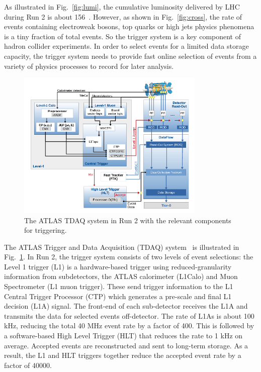 \par As illustrated in Fig.~\ref{fig:lumi}, the cumulative luminosity delivered by LHC during Run 2 is about 156~\ifb. However, as shown in Fig.~\ref{fig:cross}, the rate of events containing electroweak bosons, top quarks or high \pt jets physics phenomena is a tiny fraction of total events. So the trigger system is a key component of hadron collider experiments. In order to select events for a limited data storage capacity, the trigger system needs to provide fast online selection of events from a variety of physics processes to record for later analysis.

\begin{figure}[htbp!]
    \centering
    \includegraphics[width=0.8\textwidth]{chapters/c4/figures/TDAQ}
    \caption{The ATLAS TDAQ system in Run 2 with the relevant components for triggering.}
    \label{fig:TDAQ}
\end{figure}

\par The ATLAS Trigger and Data Acquisition (TDAQ) system~\cite{Ruiz-Martinez:2133909} is illustrated in Fig.~\ref{fig:TDAQ}. In Run 2, the trigger system consists of two levels of event selections: the Level 1 trigger (L1) is a hardware-based trigger using reduced-granularity information from subdetectors, the ATLAS calorimeter (L1Calo) and Muon Spectrometer (L1 muon trigger). These send trigger information to the L1 Central Trigger Processor (CTP) which generates a pre-scale and final L1 decision (L1A) signal. The front-end of each sub-detector receives the L1A and transmits the data for selected events off-detector. The rate of L1As is about 100 kHz, reducing the total 40 MHz event rate by a factor of 400. This is followed by a software-based High Level Trigger (HLT) that reduces the rate to 1 kHz on average. Accepted events are reconstructed and sent to long-term storage. As a result, the L1 and HLT triggers together reduce the accepted event rate by a factor of 40000.
